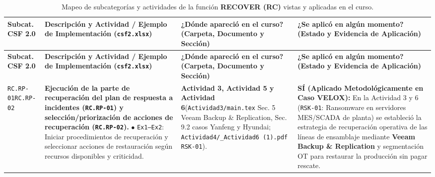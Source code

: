 \documentclass[letterpaper,11pt]{article}
\begin{document}
\begingroup
\scriptsize
\setlength{\tabcolsep}{3.5pt}
\renewcommand{\arraystretch}{1.24}
\begin{longtable}{|C{1.5cm}|L{5.3cm}|L{4.3cm}|L{5.8cm}|}
\caption{Mapeo de subcategorías y actividades de la función \textbf{RECOVER (RC)} vistas y aplicadas en el curso.}
\label{tab:mapeo-rc} \\
\hline
{}
\textbf{Subcat. CSF 2.0} & \textbf{Descripción y Actividad / Ejemplo de Implementación (\texttt{csf2.xlsx})} & \textbf{¿Dónde apareció en el curso? (Carpeta, Documento y Sección)} & \textbf{¿Se aplicó en algún momento? (Estado y Evidencia de Aplicación)} \\
\hline
\endfirsthead
\hline
{}
\textbf{Subcat. CSF 2.0} & \textbf{Descripción y Actividad / Ejemplo de Implementación (\texttt{csf2.xlsx})} & \textbf{¿Dónde apareció en el curso? (Carpeta, Documento y Sección)} & \textbf{¿Se aplicó en algún momento? (Estado y Evidencia de Aplicación)} \\
\hline
\endhead
\hline
\endfoot

\texttt{RC.RP-01}\newline \texttt{RC.RP-02} &
\textbf{Ejecución de la parte de recuperación del plan de respuesta a incidentes (\texttt{RC.RP-01}) y selección/priorización de acciones de recuperación (\texttt{RC.RP-02}).}\newline
$\bullet$ \texttt{Ex1--Ex2}: Iniciar procedimientos de recuperación y seleccionar acciones de restauración según recursos disponibles y criticidad. &
\textbf{Actividad 3, Actividad 5 y Actividad 6}\newline (\texttt{Actividad3/main.tex} Sec. 5 Veeam Backup \& Replication, Sec. 9.2 casos Yanfeng y Hyundai; \texttt{Actividad4/\_Actividad6 (1).pdf} \texttt{RSK-01}). &
\textbf{SÍ (Aplicado Metodológicamente en Caso VELOX):}\newline
En la Actividad 3 y 6 (\texttt{RSK-01}: Ransomware en servidores MES/SCADA de planta) se estableció la estrategia de recuperación operativa de las líneas de ensamblaje mediante \textbf{Veeam Backup \& Replication} y segmentación OT para restaurar la producción sin pagar rescate. \\
\hline


\end{longtable}
\end{document}
